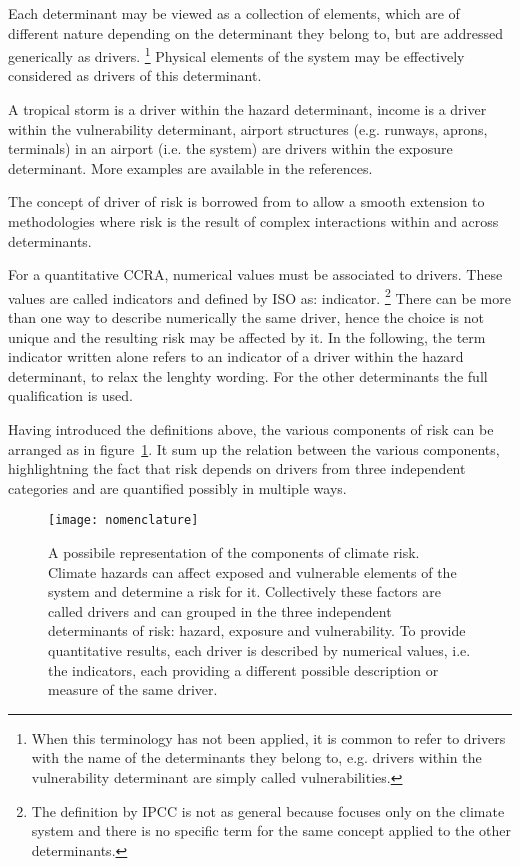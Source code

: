 Each \gls{determinant} may be viewed as a collection of elements, which are of different nature depending on the \gls{determinant} they belong to, but are addressed generically as \glspl{driver}.%
\footnote{When this terminology has not been applied, it is common to refer to \glspl{driver} with the name of the \glspl{determinant} they belong to, e.g. drivers within the \gls{vulnerability} determinant are simply called vulnerabilities.}
Physical elements of the system may be effectively considered as \Glspl{driver} of this \gls{determinant}.
\begin{example}
  A tropical storm is a \gls{driver} within the \gls{hazard} \gls{determinant},\cite[15]{2017GIZRiskSupplement} income is a \gls{driver} within the \gls{vulnerability} \gls{determinant},\cite[493]{2021SimpsonAFramework} airport structures (e.g. runways, aprons, terminals) in an airport (i.e. the system) are \glspl{driver} within the \gls{exposure} \gls{determinant}.\cite[551]{2022DeVivoRiskAssessment} More examples are available in the references.
\end{example}
The concept of \gls{driver} of \gls{risk} is borrowed from \cite{2021SimpsonAFramework} to allow a smooth extension to methodologies where \gls{risk} is the result of complex interactions within and across \glspl{determinant}.

For a quantitative \gls{CCRA}, numerical values must be associated to \glspl{driver}. These values are called \glspl{indicator} and defined by \gls{ISO} as: \glsdesc{indicator}.%
\footnote{The definition by \gls{IPCC} is not as general because focuses only on the climate system and there is no specific term for the same concept applied to the other \glspl{determinant}.}
There can be more than one way to describe numerically the same \gls{driver}, hence the choice is not unique and the resulting risk may be affected by it.
In the following, the term \gls{indicator} written alone refers to an \gls{indicator} of a \gls{driver} within the \gls{hazard} \gls{determinant}, to relax the lenghty wording. For the other \glspl{determinant} the full qualification is used.

Having introduced the definitions above, the various components of \gls{risk} can be arranged as in figure~\ref{fig:nomenclature}. It sum up the relation between the various components, highlightning the fact that risk depends on drivers from three independent categories and are quantified possibly in multiple ways.
\begin{figure}[h]
  \centering
  \texttt{[image: nomenclature]}
  \caption{A possibile representation of the components of climate risk. Climate hazards can affect exposed and vulnerable elements of the system and determine a risk for it. Collectively these factors are called drivers and can grouped in the three independent determinants of risk: hazard, exposure and vulnerability. To provide quantitative results, each driver is described by numerical values, i.e. the indicators, each providing a different possible description or measure of the same driver.}
  \label{fig:nomenclature}
\end{figure}



